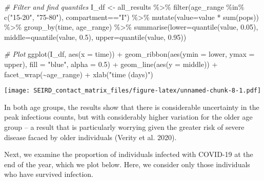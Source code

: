 \documentclass[
]{article}
\newenvironment{Shaded}{\begin{snugshade}}{\end{snugshade}}
\newcommand{\AttributeTok}[1]{\textcolor[rgb]{0.77,0.63,0.00}{#1}}
\newcommand{\CommentTok}[1]{\textcolor[rgb]{0.56,0.35,0.01}{\textit{#1}}}
\newcommand{\FloatTok}[1]{\textcolor[rgb]{0.00,0.00,0.81}{#1}}
\newcommand{\FunctionTok}[1]{\textcolor[rgb]{0.00,0.00,0.00}{#1}}
\newcommand{\NormalTok}[1]{#1}
\newcommand{\OtherTok}[1]{\textcolor[rgb]{0.56,0.35,0.01}{#1}}
\newcommand{\SpecialCharTok}[1]{\textcolor[rgb]{0.00,0.00,0.00}{#1}}
\newcommand{\StringTok}[1]{\textcolor[rgb]{0.31,0.60,0.02}{#1}}
\begin{document}
\begin{Shaded}
\begin{Highlighting}[]
\CommentTok{\# Filter and find quantiles}
\NormalTok{I\_df }\OtherTok{\textless{}{-}}\NormalTok{ all\_results }\SpecialCharTok{\%\textgreater{}\%}
  \FunctionTok{filter}\NormalTok{(age\_range }\SpecialCharTok{\%in\%} \FunctionTok{c}\NormalTok{(}\StringTok{"15{-}20"}\NormalTok{, }\StringTok{"75{-}80"}\NormalTok{),}
\NormalTok{         compartment}\SpecialCharTok{==}\StringTok{"I"}\NormalTok{) }\SpecialCharTok{\%\textgreater{}\%} 
  \FunctionTok{mutate}\NormalTok{(}\AttributeTok{value=}\NormalTok{value }\SpecialCharTok{*} \FunctionTok{sum}\NormalTok{(pops)) }\SpecialCharTok{\%\textgreater{}\%} 
  \FunctionTok{group\_by}\NormalTok{(time, age\_range) }\SpecialCharTok{\%\textgreater{}\%} 
  \FunctionTok{summarise}\NormalTok{(}\AttributeTok{lower=}\FunctionTok{quantile}\NormalTok{(value, }\FloatTok{0.05}\NormalTok{),}
            \AttributeTok{middle=}\FunctionTok{quantile}\NormalTok{(value, }\FloatTok{0.5}\NormalTok{),}
            \AttributeTok{upper=}\FunctionTok{quantile}\NormalTok{(value, }\FloatTok{0.95}\NormalTok{))}

\CommentTok{\# Plot}
\FunctionTok{ggplot}\NormalTok{(I\_df, }\FunctionTok{aes}\NormalTok{(}\AttributeTok{x =}\NormalTok{ time)) }\SpecialCharTok{+}
  \FunctionTok{geom\_ribbon}\NormalTok{(}\FunctionTok{aes}\NormalTok{(}\AttributeTok{ymin =}\NormalTok{ lower, }\AttributeTok{ymax =}\NormalTok{ upper),}
              \AttributeTok{fill =} \StringTok{"blue"}\NormalTok{, }\AttributeTok{alpha =} \FloatTok{0.5}\NormalTok{) }\SpecialCharTok{+}
  \FunctionTok{geom\_line}\NormalTok{(}\FunctionTok{aes}\NormalTok{(}\AttributeTok{y =}\NormalTok{ middle)) }\SpecialCharTok{+}
  \FunctionTok{facet\_wrap}\NormalTok{(}\SpecialCharTok{\textasciitilde{}}\NormalTok{age\_range) }\SpecialCharTok{+}
  \FunctionTok{xlab}\NormalTok{(}\StringTok{"time (days)"}\NormalTok{)}
\end{Highlighting}
\end{Shaded}

\texttt{[image: SEIRD\_contact\_matrix\_files/figure-latex/unnamed-chunk-8-1.pdf]}

In both age groups, the results show that there is considerable
uncertainty in the peak infectious counts, but with considerably higher
variation for the older age group -- a result that is particularly
worrying given the greater risk of severe disease facaed by older
individuals (Verity et al. 2020).

Next, we examine the proportion of individuals infected with COVID-19 at
the end of the year, which we plot below. Here, we consider only those
individuals who have survived infection.
\end{document}
